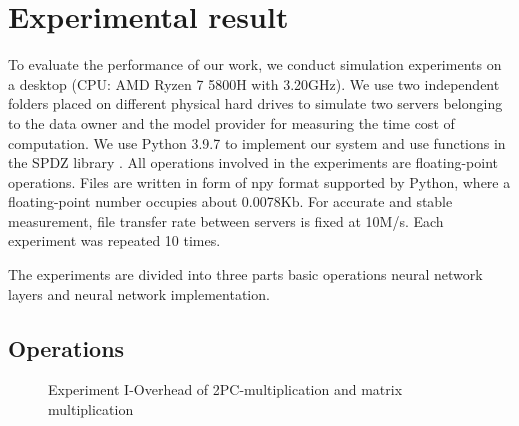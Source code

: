 \documentclass[letterpaper]{article} %
\begin{document}
    \section{Experimental result}
    To evaluate the performance of our work, we conduct simulation experiments on a desktop (CPU: AMD Ryzen 7 5800H with 3.20GHz).
    We use two independent folders placed on different physical hard drives to simulate two servers belonging to the
    data owner and the model provider for measuring the time cost of computation.
    We use Python 3.9.7 to implement our system and use functions in the SPDZ library \cite{SPDZ}.
    All operations involved in the experiments are floating-point operations.
    Files are written in form of npy format supported by Python, where a floating-point number occupies about 0.0078Kb.
    For accurate and stable measurement, file transfer rate between servers is fixed at 10M/s.
    Each experiment was repeated 10 times.

    The experiments are divided into three parts basic operations neural network layers and neural network implementation.
    \subsection{Operations}
    \begin{figure}[htbp]
        \caption{Experiment I-Overhead of 2PC-multiplication and matrix multiplication}
        \label{multiplication and matrix multiplication}

    \end{figure}
\end{document}
